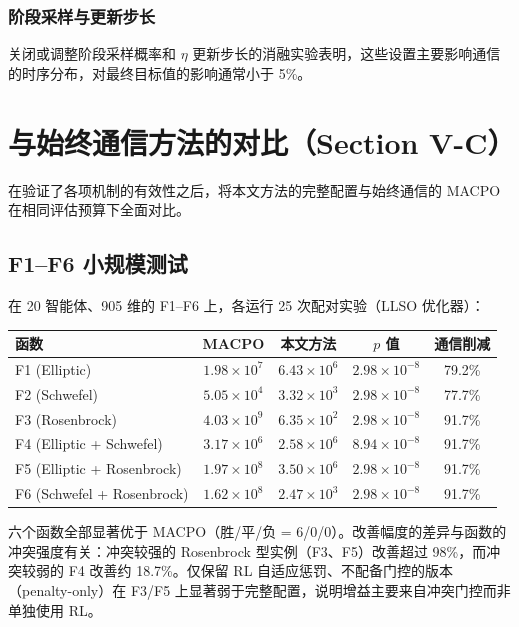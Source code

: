 \documentclass[11pt,a4paper]{ctexart}
\begin{document}
\subsubsection{阶段采样与更新步长}
关闭或调整阶段采样概率和 $\eta$ 更新步长的消融实验表明，这些设置主要影响通信的时序分布，对最终目标值的影响通常小于 5\%。

\section{与始终通信方法的对比（Section V-C）}

在验证了各项机制的有效性之后，将本文方法的完整配置与始终通信的 MACPO 在相同评估预算下全面对比。

\subsection{F1--F6 小规模测试}
在 20 智能体、905 维的 F1--F6 上，各运行 25 次配对实验（LLSO 优化器）：

\begin{center}\small
\begin{tabular}{@{}lcccc@{}}
\toprule
函数 & MACPO & 本文方法 & $p$ 值 & 通信削减 \\
\midrule
F1 (Elliptic) & $1.98\times10^7$ & \textbf{$6.43\times10^6$} & $2.98\times10^{-8}$ & 79.2\% \\
F2 (Schwefel) & $5.05\times10^4$ & \textbf{$3.32\times10^3$} & $2.98\times10^{-8}$ & 77.7\% \\
F3 (Rosenbrock) & $4.03\times10^9$ & \textbf{$6.35\times10^2$} & $2.98\times10^{-8}$ & 91.7\% \\
F4 (Elliptic + Schwefel) & $3.17\times10^6$ & \textbf{$2.58\times10^6$} & $8.94\times10^{-8}$ & 91.7\% \\
F5 (Elliptic + Rosenbrock) & $1.97\times10^8$ & \textbf{$3.50\times10^6$} & $2.98\times10^{-8}$ & 91.7\% \\
F6 (Schwefel + Rosenbrock) & $1.62\times10^8$ & \textbf{$2.47\times10^3$} & $2.98\times10^{-8}$ & 91.7\% \\
\bottomrule
\end{tabular}
\end{center}

六个函数全部显著优于 MACPO（胜/平/负 = 6/0/0）。改善幅度的差异与函数的冲突强度有关：冲突较强的 Rosenbrock 型实例（F3、F5）改善超过 98\%，而冲突较弱的 F4 改善约 18.7\%。仅保留 RL 自适应惩罚、不配备门控的版本（penalty-only）在 F3/F5 上显著弱于完整配置，说明增益主要来自冲突门控而非单独使用 RL。
\end{document}
